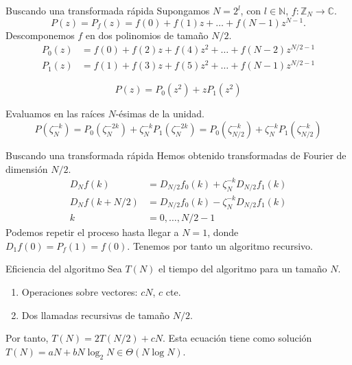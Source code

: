 \documentclass[11pt,compress]{beamer}
\newcommand\C{\mathbb{C}}
\newcommand\Z{\mathbb{Z}}
\newcommand\N{\mathbb{N}}
\begin{document}
\begin{frame}{Buscando una transformada rápida}
    Supongamos $N = 2^l$, con $l \in \N$, $f \colon \Z_N \to \C$.
    \[ P(z) = P_f(z) = f(0)+f(1)z+\dots+f(N-1)z^{N-1}. \]
    Descomponemos $f$ en dos polinomios de tamaño $N/2$.
    \begin{align*}
        P_0(z) &= f(0) + f(2)z + f(4)z^2 + \dots + f(N-2)z^{N/2-1} \\
        P_1(z) &= f(1) + f(3)z + f(5)z^2 + \dots + f(N-1)z^{N/2-1}
    \end{align*}
    \begin{tcolorbox}[colback=ChetwodeBlue!10,colframe=ChetwodeBlue!60]
        \[ P(z) = P_0(z^2) + zP_1(z^2) \]
    \end{tcolorbox}
    
    Evaluamos en las raíces $N$-ésimas de la unidad.
    \[ P(\zeta_N^{-k}) = P_0(\zeta_N^{-2k})+\zeta_N^{-k}P_1(\zeta_N^{-2k}) = P_0(\zeta_{N/2}^{-k})+\zeta_{N}^{-k}P_1(\zeta_{N/2}^{-k}) \]
\end{frame}

\begin{frame}{Buscando una transformada rápida}
    Hemos obtenido transformadas de Fourier de dimensión $N/2$.
    \begin{align*}
        D_Nf(k) &= D_{N/2}f_0(k) + \zeta_{N}^{-k}D_{N/2}f_1(k) \\
        D_Nf(k+N/2) &= D_{N/2}f_0(k) - \zeta_{N}^{-k}D_{N/2}f_1(k) \\
        k&=0, \dots,N/2-1
    \end{align*}
    Podemos repetir el proceso hasta llegar a $N=1$, donde $D_1f(0) = P_f(1) = f(0)$. Tenemos por tanto un algoritmo recursivo.
    
    \begin{alertblock}{Eficiencia del algoritmo}
        Sea $T(N)$ el tiempo del algoritmo para un tamaño $N$.
        \begin{enumerate}
             
            \item Operaciones sobre vectores: $cN$, $c$ cte.
         
            \item Dos llamadas recursivas de tamaño $N/2$.
        \end{enumerate}

        Por tanto, $T(N) = 2T(N/2) + cN$.
        Esta ecuación tiene como solución $T(N) = aN + bN \log_2 N \in \Theta(N \log N)$.
    \end{alertblock}
\end{frame}
\end{document}
